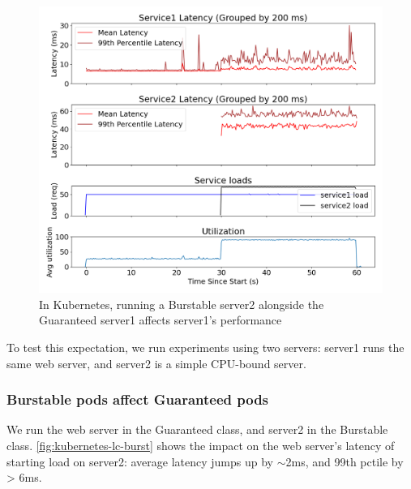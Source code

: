\begin{figure}[t]
    \centering
    \includegraphics[width=\columnwidth]{graphs/kubernetes-lc-burst.png}
    \caption{In Kubernetes, running a Burstable server2 alongside the Guaranteed
    server1 affects server1's performance}\label{fig:kubernetes-lc-burst}
\end{figure}

To test this expectation, we run experiments using two servers: server1 runs the
same web server, and server2 is a simple CPU-bound server. 

\subsubsection{Burstable pods affect Guaranteed pods}

We run the web server in the Guaranteed class, and server2 in the Burstable
class. \autoref{fig:kubernetes-lc-burst} shows the impact on the web server's
latency of starting load on server2: average latency jumps up by $\sim$2ms, and
99th pctile by > 6ms.


